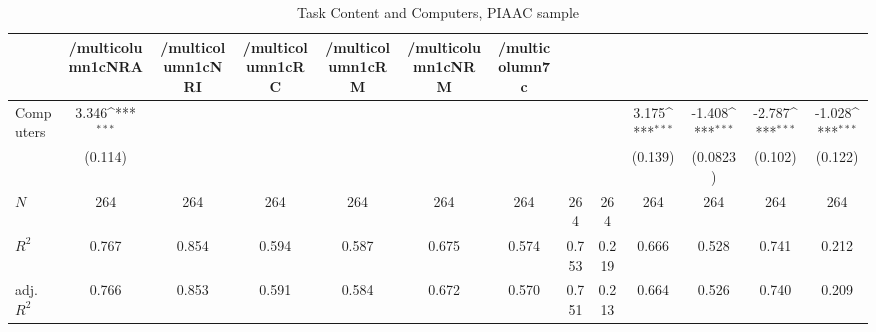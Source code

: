 \begin{table}[htbp]\centering
\def\sym#1{\ifmmode^{#1}\else\(^{#1}\)\fi}
\caption{Task Content and Computers, PIAAC sample}
\begin{tabular}{l*{12}{c}}
\hline\hline
            &/multicolumn{1}{c}{NRA}&/multicolumn{1}{c}{NRI}&/multicolumn{1}{c}{RC}&/multicolumn{1}{c}{RM}&/multicolumn{1}{c}{NRM}&/multicolumn{7}{c}{}                                                                                                                                     \\
\hline
Computers   &       3.346\sym{***}&                     &                     &                     &                     &                     &                     &                     &       3.175\sym{***}&      -1.408\sym{***}&      -2.787\sym{***}&      -1.028\sym{***}\\
            &     (0.114)         &                     &                     &                     &                     &                     &                     &                     &     (0.139)         &    (0.0823)         &     (0.102)         &     (0.122)         \\
\hline
\(N\)       &         264         &         264         &         264         &         264         &         264         &         264         &         264         &         264         &         264         &         264         &         264         &         264         \\
\(R^{2}\)   &       0.767         &       0.854         &       0.594         &       0.587         &       0.675         &       0.574         &       0.753         &       0.219         &       0.666         &       0.528         &       0.741         &       0.212         \\
adj. \(R^{2}\)&       0.766         &       0.853         &       0.591         &       0.584         &       0.672         &       0.570         &       0.751         &       0.213         &       0.664         &       0.526         &       0.740         &       0.209         \\
\hline\hline
\end{tabular}
\end{table}
